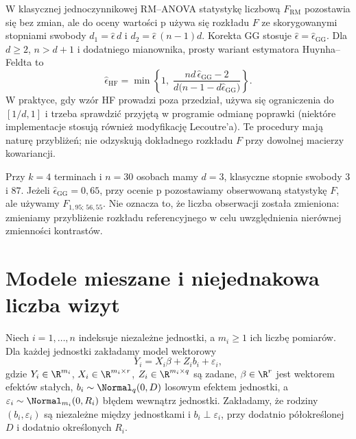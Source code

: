 \begin{definicja}\label{def:gg-hf}
W klasycznej jednoczynnikowej RM--ANOVA statystykę liczbową $F_{\mathrm{RM}}$ pozostawia się bez zmian, ale do oceny wartości p używa się rozkładu $F$ ze skorygowanymi stopniami swobody $d_1=\widehat\epsilon\,d$ i $d_2=\widehat\epsilon\,(n-1)d$. Korekta GG stosuje $\widehat\epsilon=\widehat\epsilon_{\mathrm{GG}}$. Dla $d\ge2$, $n>d+1$ i dodatniego mianownika, prosty wariant estymatora Huynha--Feldta to
\[
 \widehat\epsilon_{\mathrm{HF}}=\min\left\{1,\;\frac{nd\,\widehat\epsilon_{\mathrm{GG}}-2}{d\bigl(n-1-d\widehat\epsilon_{\mathrm{GG}}\bigr)}\right\}.
\]
W praktyce, gdy wzór HF prowadzi poza przedział, używa się ograniczenia do $[1/d,1]$ i trzeba sprawdzić przyjętą w programie odmianę poprawki (niektóre implementacje stosują również modyfikację Lecoutre'a). Te procedury mają naturę przybliżeń; nie odzyskują dokładnego rozkładu $F$ przy dowolnej macierzy kowariancji.
\end{definicja}

\begin{przyklad}
Przy $k=4$ terminach i $n=30$ osobach mamy $d=3$, klasyczne stopnie swobody $3$ i $87$. Jeżeli $\widehat\epsilon_{\mathrm{GG}}=0{,}65$, przy ocenie p pozostawiamy obserwowaną statystykę $F$, ale używamy $F_{1{,}95;\,56{,}55}$. Nie oznacza to, że liczba obserwacji została zmieniona: zmieniamy przybliżenie rozkładu referencyjnego w celu uwzględnienia nierównej zmienności kontrastów.
\end{przyklad}

\section{Modele mieszane i niejednakowa liczba wizyt}
\begin{definicja}\label{def:lmm}
Niech $i=1,\ldots,n$ indeksuje niezależne jednostki, a $m_i\ge1$ ich liczbę pomiarów. Dla każdej jednostki zakładamy model wektorowy
\[
 Y_i=X_i\beta+Z_i b_i+\varepsilon_i,
\]
gdzie $Y_i\in\R^{m_i}$, $X_i\in\R^{m_i\times r}$, $Z_i\in\R^{m_i\times q}$ są zadane, $\beta\in\R^r$ jest wektorem efektów stałych, $b_i\sim\Normal_q(0,D)$ losowym efektem jednostki, a $\varepsilon_i\sim\Normal_{m_i}(0,R_i)$ błędem wewnątrz jednostki. Zakładamy, że rodziny $(b_i,\varepsilon_i)$ są niezależne między jednostkami i $b_i\perp\varepsilon_i$, przy dodatnio półokreślonej $D$ i dodatnio określonych $R_i$.
\end{definicja}

